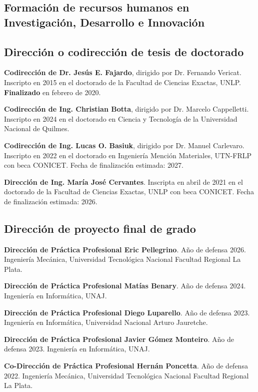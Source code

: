 \documentclass[margin,line]{res}
\begin{document}
\begin{resume}
\section{ Formación de recursos humanos en Investigación, Desarrollo e Innovación}
\vspace*{-.2in}
\subsection{ Dirección o codirección de tesis de doctorado}

{\bf Codirección de Dr. Jesús E. Fajardo}, dirigido por Dr. Fernando Vericat. Inscripto en 2015 en el doctorado de la Facultad de Ciencias Exactas, UNLP. {\bf Finalizado} en febrero de 2020.

{\bf Codirección de Ing. Christian Botta}, dirigido por Dr. Marcelo Cappelletti. Inscripto en 2024 en el doctorado en Ciencia y Tecnología de la Universidad Nacional de Quilmes.

{\bf Codirección de Ing. Lucas O. Basiuk}, dirigido por Dr. Manuel Carlevaro. Inscripto en 2022 en el doctorado en Ingeniería Mención Materiales, UTN-FRLP con beca CONICET. Fecha de finalización estimada: 2027.

{\bf Dirección de Ing. María José Cervantes}. Inscripta en abril de 2021 en el doctorado de la Facultad de Ciencias Exactas, UNLP con beca CONICET. Fecha de finalización estimada: 2026.

\subsection{ Dirección de proyecto final de grado}

{\bf Dirección de Práctica Profesional Eric Pellegrino}. Año de defensa 2026. Ingeniería Mecánica, Universidad Tecnológica Nacional Facultad Regional La Plata.

{\bf Dirección de Práctica Profesional Matías Benary}. Año de defensa 2024. Ingeniería en Informática, UNAJ.

{\bf Dirección de Práctica Profesional Diego Luparello}. Año de defensa 2023. Ingeniería en Informática, Universidad Nacional Arturo Jauretche.

{\bf Dirección de Práctica Profesional Javier Gómez Monteiro}. Año de defensa 2023. Ingeniería en Informática, UNAJ.

{\bf Co-Dirección de Práctica Profesional Hernán Poncetta}. Año de defensa 2022. Ingeniería Mecánica, Universidad Tecnológica Nacional Facultad Regional La Plata.


\end{resume}
\end{document}
